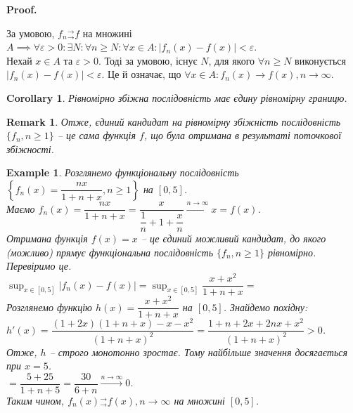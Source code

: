 \documentclass[a4paper, 10pt]{article}
\makeatletter
\def\huge{\displaystyle}
\def\qed{$\blacksquare$}
\theoremstyle{theoremdd}
\theoremstyle{theoremdd}
\theoremstyle{theoremdd}
\theoremstyle{theoremdd}
\theoremstyle{theoremdd}
\newtheorem{example}[theorem]{Example}
\theoremstyle{theoremdd}
\theoremstyle{theoremdd}
\newtheorem{remark}[theorem]{Remark}
\theoremstyle{theoremdd}
\theoremstyle{theoremdd}
\newtheorem{corollary}[theorem]{Corollary}
\renewenvironment{proof}[1][Proof.\\]{\par
\pushQED{\hfill \qed}%
\normalfont \topsep6\p@\@plus6\p@\relax
\trivlist
\item\relax
{\bfseries
#1\@addpunct{.}}\hspace\labelsep\ignorespaces
}{%
\popQED\endtrivlist\@endpefalse
}
\newcommand{\tounif}{^\rightarrow_\rightarrow}
\makeatother
\begin{document}
\begin{proof}
За умовою, $f_n{}\tounif f$ на множині $A \implies \forall \varepsilon > 0: \exists N: \forall n \geq N: \forall x \in A: |f_n(x) - f(x)| < \varepsilon$.\\
Нехай $x \in A$ та $\varepsilon > 0$. Тоді за умовою, існує $N$, для якого $\forall n \geq N$ виконується $|f_n(x) - f(x)| < \varepsilon$. Це й означає, що $\forall x \in A: f_n(x) \to f(x), n \to \infty$.
\end{proof}

\begin{corollary}
Рівномірно збіжна послідовність має єдину рівномірну границю.
\end{corollary}

\begin{remark}
Отже, єдиний кандидат на рівномірну збіжність послідовність $\{f_n, n \geq 1\}$ -- це сама функція $f$, що була отримана в результаті поточкової збіжності.
\end{remark}

\begin{example}
Розглянемо функціональну послідовність $\left\{ f_n(x) = \dfrac{nx}{1+n+x}, n \geq 1 \right\}$ на $[0,5]$.\\
Маємо $f_n(x) = \dfrac{nx}{1+n+x} = \dfrac{x}{\dfrac{1}{n}+ 1 + \dfrac{x}{n}} \overset{n \to \infty}{\longrightarrow} x = f(x)$. \\
Отримана функція $f(x) = x$ -- це єдиний можливий кандидат, до якого (можливо) прямує функціональна послідовність $\{f_n, n \geq 1\}$ рівномірно. Перевіримо це.\\
$\huge\sup_{x \in [0,5]} |f_n(x) - f(x)| = \sup_{x \in [0,5]} \dfrac{x+x^2}{1+n+x} \boxed{=}$\\
Розглянемо функцію $h(x) = \dfrac{x+x^2}{1+n+x}$ на $[0,5]$. Знайдемо похідну:\\
$h'(x) = \dfrac{(1+2x)(1+n+x) - x-x^2}{(1+n+x)^2} = \dfrac{1+n+2x+2nx+x^2}{(1+n+x)^2} > 0$.\\
Отже, $h$ -- строго монотонно зростає. Тому найбільше значення досягається при $x = 5$.\\
$\boxed{=} \dfrac{5+25}{1+n+5} = \dfrac{30}{6+n} \overset{n \to \infty}{\longrightarrow} 0$.\\
Таким чином, $f_n(x){}\tounif f(x), n \to \infty$ на множині $[0,5]$.
\end{example}
\end{document}
